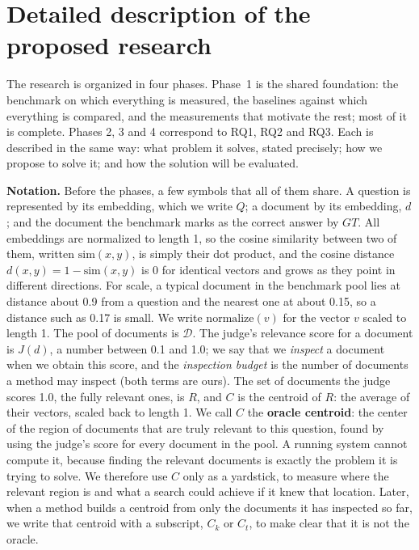 \documentclass[12pt,a4paper]{article}
\newcommand{\dist}{d}
\newcommand{\simf}{\mathrm{sim}}
\begin{document}
\section{Detailed description of the proposed research}

The research is organized in four phases. Phase~1 is the shared foundation: the benchmark on which everything is measured, the baselines against which everything is compared, and the measurements that motivate the rest; most of it is complete. Phases 2, 3 and 4 correspond to RQ1, RQ2 and RQ3. Each is described in the same way: what problem it solves, stated precisely; how we propose to solve it; and how the solution will be evaluated.

\textbf{Notation.} Before the phases, a few symbols that all of them share. A question is represented by its embedding, which we write $Q$; a document by its embedding, $d$; and the document the benchmark marks as the correct answer by $GT$. All embeddings are normalized to length 1, so the cosine similarity between two of them, written $\simf(x,y)$, is simply their dot product, and the cosine distance $\dist(x,y)=1-\simf(x,y)$ is 0 for identical vectors and grows as they point in different directions. For scale, a typical document in the benchmark pool lies at distance about 0.9 from a question and the nearest one at about 0.15, so a distance such as 0.17 is small. We write $\mathrm{normalize}(v)$ for the vector $v$ scaled to length 1. The pool of documents is $\mathcal{D}$. The judge's relevance score for a document is $J(d)$, a number between 0.1 and 1.0; we say that we \emph{inspect} a document when we obtain this score, and the \emph{inspection budget} is the number of documents a method may inspect (both terms are ours). The set of documents the judge scores 1.0, the fully relevant ones, is $R$, and $C$ is the centroid of $R$: the average of their vectors, scaled back to length 1. We call $C$ the \textbf{oracle centroid}: the center of the region of documents that are truly relevant to this question, found by using the judge's score for every document in the pool. A running system cannot compute it, because finding the relevant documents is exactly the problem it is trying to solve. We therefore use $C$ only as a yardstick, to measure where the relevant region is and what a search could achieve if it knew that location. Later, when a method builds a centroid from only the documents it has inspected so far, we write that centroid with a subscript, $C_k$ or $C_t$, to make clear that it is not the oracle.
\end{document}
